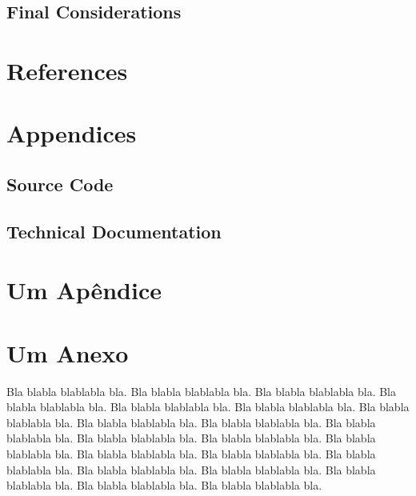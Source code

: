 \documentclass[tcc,capa]{texufpel}
\begin{document}
\section{Final Considerations}

\chapter{References}

\chapter{Appendices}
\section{Source Code}
\section{Technical Documentation}






 

\apendices
\chapter{Um Apêndice}

\anexos
\chapter{Um Anexo}

Bla blabla blablabla bla.  Bla blabla blablabla bla.  Bla blabla
blablabla bla.  Bla blabla blablabla bla.  Bla blabla blablabla bla.
Bla blabla blablabla bla.  Bla blabla blablabla bla.  Bla blabla
blablabla bla.  Bla blabla blablabla bla.  Bla blabla blablabla bla.
Bla blabla blablabla bla.  Bla blabla blablabla bla.  Bla blabla
blablabla bla.  Bla blabla blablabla bla.  Bla blabla blablabla bla.
Bla blabla blablabla bla.  Bla blabla blablabla bla.  Bla blabla
blablabla bla.  Bla blabla blablabla bla.  Bla blabla blablabla bla.
Bla blabla blablabla bla.
\end{document}
